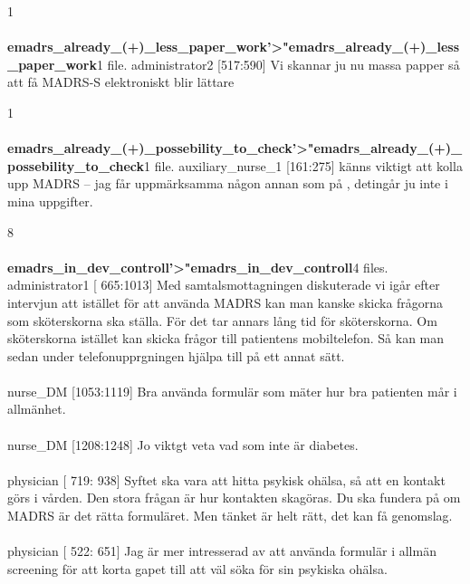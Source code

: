 \documentclass[12pt,a4paper,oneside]{article}
\begin{document}
1 \\\ \\{\bf emadrs\_already\_(+)\_less\_paper\_work'>"emadrs\_already\_(+)\_less\_paper\_work}1 file.
 administrator2 [517:590] 
Vi skannar ju nu massa papper s{\aa} att f{\aa} MADRS-S elektroniskt blir lättare %

1 \\\ \\{\bf emadrs\_already\_(+)\_possebility\_to\_check'>"emadrs\_already\_(+)\_possebility\_to\_check}1 file.
 auxiliary\_nurse\_1 [161:275] 
 känns viktigt att kolla upp MADRS -- jag f{\aa}r uppmärksamma n{\aa}gon annan som p{\aa} , deting{\aa}r ju inte i mina uppgifter. %

8 \\\ \\{\bf emadrs\_in\_dev\_controll'>"emadrs\_in\_dev\_controll}4 files.
 administrator1 [ 665:1013] 
Med samtalsmottagningen diskuterade vi ig{\aa}r efter intervjun att istället f{\"o}r att använda MADRS  kan man kanske skicka fr{\aa}gorna som sk{\"o}terskorna ska ställa. F{\"o}r det tar annars l{\aa}ng tid f{\"o}r sk{\"o}terskorna. Om sk{\"o}terskorna istället kan skicka fr{\aa}gor till patientens mobiltelefon. S{\aa} kan man sedan under telefonupprgningen hjälpa till p{\aa} ett annat sätt.  %
\\\ \\
 nurse\_DM [1053:1119] 
Bra använda formulär som mäter hur bra patienten m{\aa}r i allmänhet.  %
\\\ \\
 nurse\_DM [1208:1248] 
Jo viktgt veta vad som inte är diabetes. %
\\\ \\
 physician [ 719: 938] 
 Syftet ska vara att hitta psykisk ohälsa, s{\aa} att en kontakt g{\"o}rs i v{\aa}rden. Den stora fr{\aa}gan är hur kontakten skag{\"o}ras. Du ska fundera p{\aa} om MADRS är det rätta formuläret. Men tänket är helt rätt, det kan f{\aa} genomslag.  %
\\\ \\
 physician [ 522: 651] 
Jag är mer intresserad av att använda formulär i allmän screening f{\"o}r att korta gapet till att väl s{\"o}ka f{\"o}r sin psykiska ohälsa.  %
\\\ \\
\end{document}
